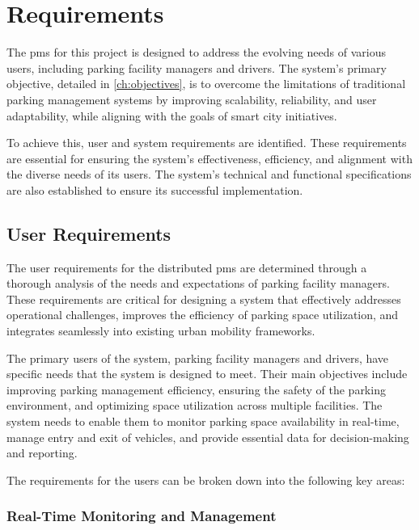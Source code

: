\chapter{Requirements}\label{ch:requirements}

The \gls{pms} for this project is designed to address the evolving needs of various users, including parking facility managers and drivers. The system's primary objective, detailed in \cref{ch:objectives}, is to overcome the limitations of traditional parking management systems by improving scalability, reliability, and user adaptability, while aligning with the goals of smart city initiatives.

To achieve this, user and system requirements are identified. These requirements are essential for ensuring the system’s effectiveness, efficiency, and alignment with the diverse needs of its users. The system's technical and functional specifications are also established to ensure its successful implementation.

\section{User Requirements}\label{sec:user_requirements}

The user requirements for the distributed \gls{pms} are determined through a thorough analysis of the needs and expectations of parking facility managers. These requirements are critical for designing a system that effectively addresses operational challenges, improves the efficiency of parking space utilization, and integrates seamlessly into existing urban mobility frameworks.

The primary users of the system, parking facility managers and drivers, have specific needs that the system is designed to meet. Their main objectives include improving parking management efficiency, ensuring the safety of the parking environment, and optimizing space utilization across multiple facilities. The system needs to enable them to monitor parking space availability in real-time, manage entry and exit of vehicles, and provide essential data for decision-making and reporting.

The requirements for the users can be broken down into the following key areas:

\subsection{Real-Time Monitoring and Management}

